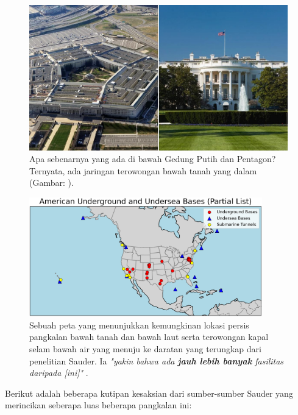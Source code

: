 \documentclass[10pt,twocolumn,letterpaper]{article}
\begin{document}
\begin{figure}[b]
\begin{center}
   \includegraphics[width=1\linewidth]{penta.jpg}
\end{center}
   \caption{Apa sebenarnya yang ada di bawah Gedung Putih dan Pentagon? Ternyata, ada jaringan terowongan bawah tanah yang dalam (Gambar: \cite{31}).}
\label{fig:3}
\label{fig:onecol}
\end{figure}
\begin{figure}[t]
\begin{center}
\includegraphics[width=0.9\textwidth]{basescrop.png}
\end{center}
   \caption{Sebuah peta yang menunjukkan kemungkinan lokasi persis pangkalan bawah tanah dan bawah laut serta terowongan kapal selam bawah air yang menuju ke daratan yang terungkap dari penelitian Sauder. Ia \textit{"yakin bahwa ada \textbf{jauh lebih banyak} fasilitas daripada [ini]"} \cite{22}.}
   \label{fig:4}
\end{figure}

Berikut adalah beberapa kutipan kesaksian dari sumber-sumber Sauder yang merincikan seberapa luas beberapa pangkalan ini:
\end{document}
